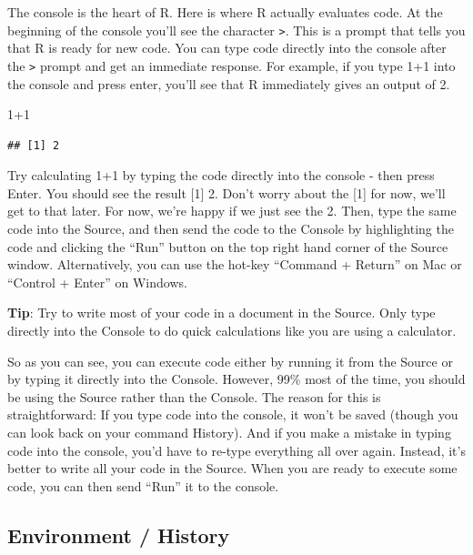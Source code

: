\documentclass[
]{book}
\newenvironment{Shaded}{\begin{snugshade}}{\end{snugshade}}
\newcommand{\DecValTok}[1]{\textcolor[rgb]{0.00,0.00,0.81}{#1}}
\newcommand{\SpecialCharTok}[1]{\textcolor[rgb]{0.00,0.00,0.00}{#1}}
\begin{document}
The console is the heart of R. Here is where R actually evaluates code. At the beginning of the console you'll see the character \texttt{>}. This is a prompt that tells you that R is ready for new code. You can type code directly into the console after the \texttt{>} prompt and get an immediate response. For example, if you type 1+1 into the console and press enter, you'll see that R immediately gives an output of 2.

\begin{Shaded}
\begin{Highlighting}[]
\DecValTok{1}\SpecialCharTok{+}\DecValTok{1}
\end{Highlighting}
\end{Shaded}

\begin{verbatim}
## [1] 2
\end{verbatim}

Try calculating 1+1 by typing the code directly into the console - then press Enter. You should see the result {[}1{]} 2. Don't worry about the {[}1{]} for now, we'll get to that later. For now, we're happy if we just see the 2. Then, type the same code into the Source, and then send the code to the Console by highlighting the code and clicking the ``Run'' button on the top right hand corner of the Source window. Alternatively, you can use the hot-key ``Command + Return'' on Mac or ``Control + Enter'' on Windows.

\textbf{Tip}: Try to write most of your code in a document in the Source. Only type directly into the Console to do quick calculations like you are using a calculator.

So as you can see, you can execute code either by running it from the Source or by typing it directly into the Console. However, 99\% most of the time, you should be using the Source rather than the Console. The reason for this is straightforward: If you type code into the console, it won't be saved (though you can look back on your command History). And if you make a mistake in typing code into the console, you'd have to re-type everything all over again. Instead, it's better to write all your code in the Source. When you are ready to execute some code, you can then send ``Run'' it to the console.

\hypertarget{environment-history}{%
\subsection{Environment / History}\label{environment-history}}
\end{document}
